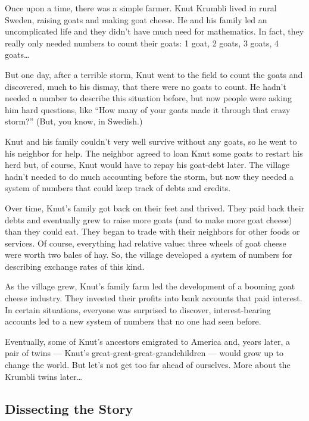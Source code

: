 \newenvironment{story}
{\begin{slshape}}
{\end{slshape}}

\begin{story}
Once upon a time, there was a simple farmer. Knut Krumbli lived in rural Sweden, raising goats and making goat cheese. He and his family led an uncomplicated life and they didn't have much need for mathematics. In fact, they really only needed numbers to count their goats: 1 goat, 2 goats, 3 goats, 4 goats\ldots

But one day, after a terrible storm, Knut went to the field to count the goats and discovered, much to his dismay, that there were no goats to count. He hadn't needed a number to describe this situation before, but now people were asking him hard questions, like ``How many of your goats made it through that crazy storm?'' (But, you know, in Swedish.)

Knut and his family couldn't very well survive without any goats, so he went to his neighbor for help. The neighbor agreed to loan Knut some goats to restart his herd but, of course, Knut would have to repay his goat-debt later. The village hadn't needed to do much accounting before the storm, but now they needed a system of numbers that could keep track of debts and credits.

Over time, Knut's family got back on their feet and thrived. They paid back their debts and eventually grew to raise more goats (and to make more goat cheese) than they could eat. They began to trade with their neighbors for other foods or services. Of course, everything had relative value: three wheels of goat cheese were worth two bales of hay. So, the village developed a system of numbers for describing exchange rates of this kind.

As the village grew, Knut's family farm led the development of a booming goat cheese industry. They invested their profits into bank accounts that paid interest. In certain situations, everyone was surprised to discover, interest-bearing accounts led to a new system of numbers that no one had seen before.

Eventually, some of Knut's ancestors emigrated to America and, years later, a pair of twins --- Knut's great-great-great-grandchildren --- would grow up to change the world. But let's not get too far ahead of ourselves. More about the Krumbli twins later\ldots
\end{story}

\subsection{Dissecting the Story}

